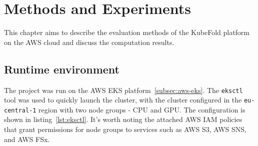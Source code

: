 
\chapter{Methods and Experiments}

This chapter aims to describe the evaluation methods of the KubeFold platform on the AWS cloud and discuss the computation results.

\section{Runtime environment}

The project was run on the AWS EKS platform~\ref{subsec:aws-eks}.
The \texttt{eksctl} tool was used to quickly launch the cluster, with the cluster configured in the \texttt{eu-central-1} region with two node groups - CPU and GPU.
The configuration is shown in listing~\ref{lst:eksctl}.
It's worth noting the attached AWS IAM policies that grant permissions for node groups to services such as AWS S3, AWS SNS, and AWS FSx.


